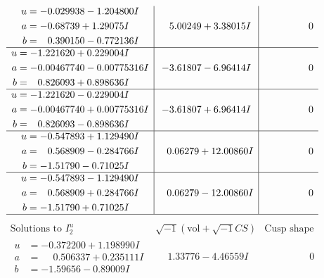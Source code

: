 \documentclass[1p]{elsarticle_modified}
\theoremstyle{definition}
\newcommand{\I}{\sqrt{-1}}
\begin{document}
$$\begin{array}{c|c|c}
\begin{aligned}
u &= -0.029938 - 1.204800 I \\
a &= -0.68739 + 1.29075 I \\
b &= \phantom{-}0.390150 - 0.772136 I\end{aligned}
 & \phantom{-}5.00249 + 3.38015 I & \phantom{-0.000000 } 0 \\ \hline\begin{aligned}
u &= -1.221620 + 0.229004 I \\
a &= -0.00467740 - 0.00775316 I \\
b &= \phantom{-}0.826093 + 0.898636 I\end{aligned}
 & -3.61807 - 6.96414 I & \phantom{-0.000000 } 0 \\ \hline\begin{aligned}
u &= -1.221620 - 0.229004 I \\
a &= -0.00467740 + 0.00775316 I \\
b &= \phantom{-}0.826093 - 0.898636 I\end{aligned}
 & -3.61807 + 6.96414 I & \phantom{-0.000000 } 0 \\ \hline\begin{aligned}
u &= -0.547893 + 1.129490 I \\
a &= \phantom{-}0.568909 - 0.284766 I \\
b &= -1.51790 - 0.71025 I\end{aligned}
 & \phantom{-}0.06279 + 12.00860 I & \phantom{-0.000000 } 0 \\ \hline\begin{aligned}
u &= -0.547893 - 1.129490 I \\
a &= \phantom{-}0.568909 + 0.284766 I \\
b &= -1.51790 + 0.71025 I\end{aligned}
 & \phantom{-}0.06279 - 12.00860 I & \phantom{-0.000000 } 0\\
 \hline 
 \end{array}$$\newpage$$\begin{array}{c|c|c}  
\text{Solutions to }I^u_{2}& \I (\text{vol} + \sqrt{-1}CS) & \text{Cusp shape}\\
 \hline 
\begin{aligned}
u &= -0.372200 + 1.198990 I \\
a &= \phantom{-}0.506337 + 0.235111 I \\
b &= -1.59656 - 0.89009 I\end{aligned}
 & \phantom{-}1.33776 - 4.46559 I & \phantom{-0.000000 } 0 \\ \hline\begin{aligned}

\end{aligned}
\end{array}$$
\end{document}
